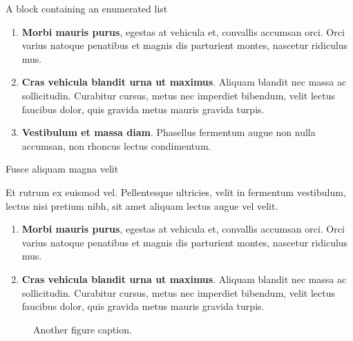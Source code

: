 \documentclass[final]{beamer}
\newlength{\colwidth}
\begin{document}
\begin{frame}[t]
\begin{columns}[t]
\begin{column}{\colwidth}
\begin{defbox}{A block containing an enumerated list}{}
				\begin{enumerate}
					\item \textbf{Morbi mauris purus}, egestas at vehicula et, convallis
					      accumsan orci. Orci varius natoque penatibus et magnis dis parturient
					      montes, nascetur ridiculus mus.
					\item \textbf{Cras vehicula blandit urna ut maximus}. Aliquam blandit nec
					      massa ac sollicitudin. Curabitur cursus, metus nec imperdiet bibendum,
					      velit lectus faucibus dolor, quis gravida metus mauris gravida turpis.
					\item \textbf{Vestibulum et massa diam}. Phasellus fermentum augue non
					      nulla accumsan, non rhoncus lectus condimentum.
				\end{enumerate}

			\end{defbox}

			\begin{block}{Fusce aliquam magna velit}

				Et rutrum ex euismod vel. Pellentesque ultricies, velit in fermentum
				vestibulum, lectus nisi pretium nibh, sit amet aliquam lectus augue vel
				velit.

				\begin{enumerate}
					\item \textbf{Morbi mauris purus}, egestas at vehicula et, convallis
					      accumsan orci. Orci varius natoque penatibus et magnis dis parturient
					      montes, nascetur ridiculus mus.
					\item \textbf{Cras vehicula blandit urna ut maximus}. Aliquam blandit nec
					      massa ac sollicitudin. Curabitur cursus, metus nec imperdiet bibendum,
					      velit lectus faucibus dolor, quis gravida metus mauris gravida turpis.
				\end{enumerate}

				\begin{figure}
					\centering
					\caption{Another figure caption.}
				\end{figure}


\end{block}
\end{column}
\end{columns}
\end{frame}
\end{document}
